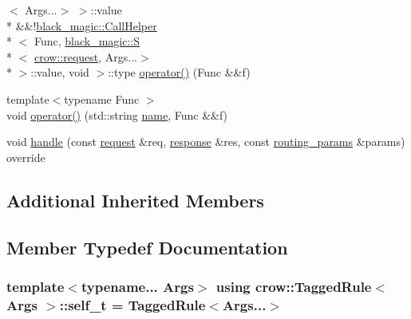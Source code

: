 \begin{DoxyCompactItemize}
$<$ Args...$>$ $>$\-::value \\*
\&\&!\hyperlink{structcrow_1_1black__magic_1_1_call_helper}{black\-\_\-magic\-::\-Call\-Helper}\\*
$<$ Func, \hyperlink{structcrow_1_1black__magic_1_1_s}{black\-\_\-magic\-::\-S}\\*
$<$ \hyperlink{structcrow_1_1request}{crow\-::request}, Args...$>$\\*
 $>$\-::value, void $>$\-::type \hyperlink{classcrow_1_1_tagged_rule_a811244dd43b7a5bfa536f5eab1955a7e}{operator()} (Func \&\&f)
\item 
{\footnotesize template$<$typename Func $>$ }\\void \hyperlink{classcrow_1_1_tagged_rule_aeed24311bbc5faa60e5c07ffcad2a5de}{operator()} (std\-::string \hyperlink{structcrow_1_1_rule_parameter_traits_aa330efc6368bb7b66901122f1e8e4943}{name}, Func \&\&f)
\item 
void \hyperlink{classcrow_1_1_tagged_rule_a919704d5a12bfebb209c866d2726c855}{handle} (const \hyperlink{structcrow_1_1request}{request} \&req, \hyperlink{structcrow_1_1response}{response} \&res, const \hyperlink{structcrow_1_1routing__params}{routing\-\_\-params} \&params) override
\end{DoxyCompactItemize}
\subsection*{Additional Inherited Members}


\subsection{Member Typedef Documentation}
\hypertarget{classcrow_1_1_tagged_rule_aae5d1683e30a8d4e058666b7d12dea14}{
\subsubsection[{self\-\_\-t}]{\setlength{\rightskip}{0pt plus 5cm}template$<$typename... Args$>$ using {\bf crow\-::\-Tagged\-Rule}$<$ Args $>$\-::{\bf self\-\_\-t} =  {\bf Tagged\-Rule}$<$Args...$>$}}\label{classcrow_1_1_tagged_rule_aae5d1683e30a8d4e058666b7d12dea14}


